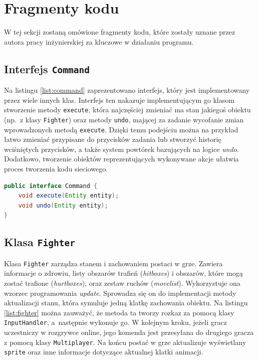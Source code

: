 \section{Fragmenty kodu}
W tej sekcji zostaną omówione fragmenty kodu, które zostały uznane przez autora pracy inżynierskiej za kluczowe w działaniu programu.
\subsection{Interfejs \texttt{Command}}
Na listingu \ref{list:command} zaprezentowano interfejs, który jest implementowany przez wiele innych klas. Interfejs ten nakazuje implementującym go klasom stworzenie metody \texttt{execute}, która najczęściej zmieniać ma stan jakiegoś obiektu (np.\ z klasy \texttt{Fighter}) oraz metody \texttt{undo}, mającej za zadanie wycofanie zmian wprowadzonych metodą \texttt{execute}. Dzięki temu podejściu można na przykład łatwo zmieniać przypisane do przycisków zadania lub stworzyć historię wciśniętych przycisków, a także system powtórek bazujących na logice \emph{undo}. Dodatkowo, tworzenie obiektów reprezentujących wykonywane akcje ułatwia proces tworzenia kodu sieciowego.
\begin{lstlisting}[language=Java,style=JavaStyle,label=list:command,caption=Interfejs \texttt{Command},
                   basicstyle=\footnotesize\ttfamily]
public interface Command {
    void execute(Entity entity);
    void undo(Entity entity);
}
\end{lstlisting}

\subsection{Klasa \texttt{Fighter}}
Klasa \texttt{Fighter} zarządza stanem i zachowaniem postaci w grze. Zawiera informacje o zdrowiu, listy obszarów trafień (\emph{hitboxes}) i obszarów, które mogą zostać trafione (\emph{hurtboxes}), oraz zestaw ruchów (\emph{movelist}). Wykorzystuje ona wzorzec programowania \emph{update}. Sprowadza się on do implementacji metody aktualizacji stanu, która symuluje jedną klatkę zachowania obiektu. Na listingu \ref{list:fighter} można zauważyć, że metoda ta tworzy rozkaz za pomocą klasy \texttt{InputHandler}, a~następnie wykonuje go. W kolejnym kroku, jeżeli gracz uczestniczy w rozgrywce online, jego komenda jest przesyłana do drugiego gracza z pomocą klasy \texttt{Multiplayer}. Na końcu postać w grze aktualizuje wyświetlany \texttt{sprite} oraz inne informacje dotyczące aktualnej klatki animacji.

